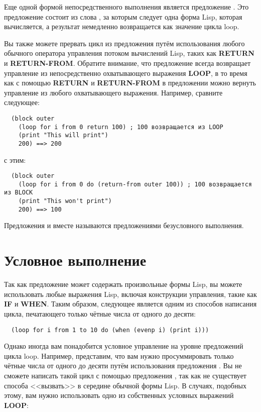 Еще одной формой непосредственного выполнения является предложение . Это
предложение состоит из слова , за которым следует одна форма Lisp, которая
вычисляется, а результат немедленно возвращается как значение цикла loop.

Вы также можете прервать цикл из предложения  путём использования любого обычного
оператора управления потоком вычислений Lisp, таких как \textbf{RETURN} и
\textbf{RETURN-FROM}. Обратите внимание, что предложение  всегда возвращает
управление из непосредственно охватывающего выражения \textbf{LOOP}, в то время как с
помощью \textbf{RETURN} и \textbf{RETURN-FROM} в предложении  можно вернуть
управление из любого охватывающего выражения. Например, сравните следующее:

\begin{lstlisting}
  (block outer
    (loop for i from 0 return 100) ; 100 возвращается из LOOP
    (print "This will print")
    200) ==> 200
\end{lstlisting}

с этим:

\begin{lstlisting}
  (block outer
    (loop for i from 0 do (return-from outer 100)) ; 100 возвращается из BLOCK
    (print "This won't print")
    200) ==> 100
\end{lstlisting}

Предложения  и  вместе называются предложениями безусловного
выполнения.

\section{Условное выполнение}

Так как предложение  может содержать произвольные формы Lisp, вы можете
использовать любые выражения Lisp, включая конструкции управления, такие как \textbf{IF} и
\textbf{WHEN}. Таким образом, следующее является одним из способов написания цикла,
печатающего только чётные числа от одного до десяти:

\begin{lstlisting}
  (loop for i from 1 to 10 do (when (evenp i) (print i)))
\end{lstlisting}

Однако иногда вам понадобится условное управление на уровне предложений цикла
loop. Например, представим, что вам нужно просуммировать только чётные числа от одного до
десяти путём использования предложения . Вы не сможете написать такой цикл с
помощью предложения , так как не существует способа <<вызвать>>  в
середине обычной формы Lisp. В случаях, подобных этому, вам нужно использовать одно из
собственных условных выражений \textbf{LOOP}:

